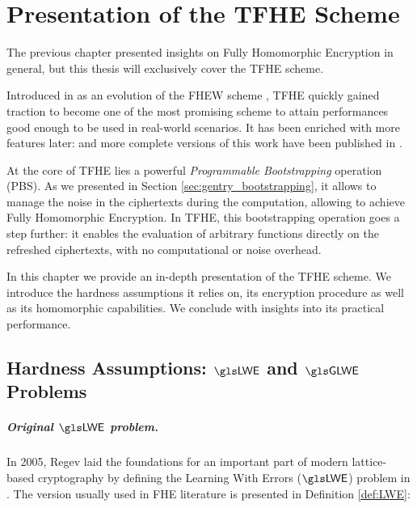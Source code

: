
\chapter{Presentation of the \gls{TFHE} Scheme}
\label{chap:spec_tfhe}

The previous chapter presented insights on Fully Homomorphic Encryption in general, but this thesis will exclusively cover the \gls{TFHE} scheme.

Introduced in \cite{AC:CGGI16, AC:CGGI17} as an evolution of the FHEW scheme \cite{EC:DucMic15}, \gls{TFHE} quickly gained traction to become one of the most promising scheme to attain performances good enough to be  used in real-world scenarios. It has been enriched with more features later: and more complete versions of this work have been published in \cite{JC:CGGI20, these_chillotti}.

At the core of \gls{TFHE} lies a powerful \textit{Programmable Bootstrapping} operation (\gls{PBS}). As we presented in Section \ref{sec:gentry_bootstrapping}, it allows to manage the noise in the ciphertexts during the computation, allowing to achieve Fully Homomorphic Encryption. In \gls{TFHE}, this bootstrapping operation goes a step further: it enables the evaluation of arbitrary functions directly on the refreshed ciphertexts, with no computational or noise overhead.

In this chapter we provide an in-depth presentation of the \gls{TFHE} scheme. We introduce the hardness assumptions it relies on, its encryption procedure as well as its homomorphic capabilities. We conclude with insights into its practical performance.

\section{Hardness Assumptions: $\LWE$ and $\GLWE$ Problems}
\label{sec:hardness_assumptions}


\paragraph{Original $\LWE$ problem.}

In 2005, Regev laid the foundations for an important part of modern lattice-based cryptography by defining the Learning With Errors ($\LWE$) problem in \cite{STOC:Regev05}. The version usually used in \gls{FHE} literature is presented in Definition \ref{def:LWE}:


